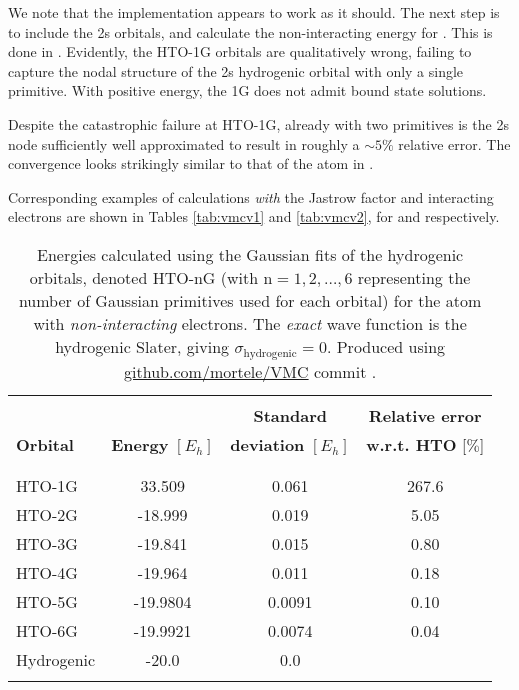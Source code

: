 \documentclass[../../master.tex]{subfiles}
\begin{document}
We note that the implementation appears to work as it should. The next step is to include the 2s orbitals, and calculate the non-interacting energy for . This is done in . Evidently, the HTO-1G orbitals are qualitatively wrong, failing to capture the nodal structure of the 2s hydrogenic orbital with only a single primitive. With positive energy, the 1G  does not admit bound state solutions. 

Despite the catastrophic failure at HTO-1G, already with two primitives is the 2s node sufficiently well approximated to result in roughly a $\sim5\%$ relative error. The convergence looks strikingly similar to that of the  atom in . 

Corresponding examples of calculations \emph{with} the Jastrow factor and interacting electrons are shown in Tables \ref{tab:vmcv1} and \ref{tab:vmcv2}, for  and  respectively.

\begin{table}
\centering{}
\setlength\extrarowheight{2pt}
\begin{tabularx}{\textwidth}{X *{3}{S[table-format=-1.3,table-space-text-post=***]}}
\hline
\hline
\\[-0.9em]
                 &                          & \phantom{-}\textbf{Standard}          & \textbf{Relative error}    \\
\textbf{Orbital} & \textbf{Energy} $[E_h]$  & \textbf{deviation} $[E_h]$ & \textbf{w.r.t. HTO} [$\%$]  \\
\\[-0.9em]
\hline
\\[-0.9em]
HTO-1G &  33.509   & 0.061   &  267.6 \\
HTO-2G & -18.999   & 0.019   &  5.05 \\
HTO-3G & -19.841   & 0.015   &  0.80 \\
HTO-4G & -19.964   & 0.011   &  0.18 \\
HTO-5G & -19.9804  & 0.0091  &  0.10 \\
HTO-6G & -19.9921  & 0.0074  &  0.04 \\
Hydrogenic    & -20.0    & 0.0 & \\
\\[-0.9em]
\hline
\end{tabularx}
\caption{Energies calculated using the Gaussian fits of the hydrogenic orbitals, denoted HTO-nG (with $\text{n}=1,2,\dots,6$ representing the number of Gaussian primitives used for each orbital) for the  atom with \emph{non-interacting} electrons. The \emph{exact} wave function is the hydrogenic Slater, giving $\sigma_\text{hydrogenic}=0$. Produced using \url{github.com/mortele/VMC} commit . \label{tab:vmcgaussnonint2}}
\end{table}
\end{document}
